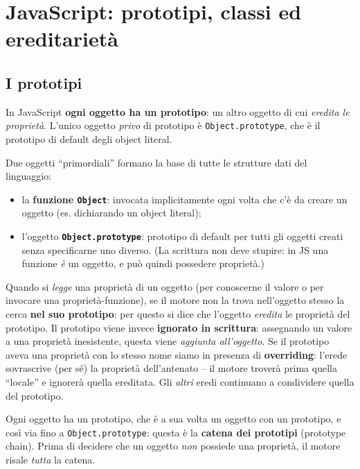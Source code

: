 \chapter{JavaScript: prototipi, classi ed ereditariet\`a}

\section{I prototipi}

\begin{definizione}[Prototipo]
In JavaScript \textbf{ogni oggetto ha un prototipo}: un altro oggetto di cui \emph{eredita le
propriet\`a}. L'unico oggetto \emph{privo} di prototipo \`e \texttt{Object.prototype}, che \`e
il prototipo di default degli object literal.
\end{definizione}

Due oggetti ``primordiali'' formano la base di tutte le strutture dati del linguaggio:
\begin{itemize}
  \item la \textbf{funzione \texttt{Object}}: invocata implicitamente ogni volta che c'\`e da
        creare un oggetto (es. dichiarando un object literal);
  \item l'oggetto \textbf{\texttt{Object.prototype}}: prototipo di default per tutti gli
        oggetti creati senza specificarne uno diverso. (La scrittura non deve stupire: in JS
        una funzione \emph{\`e} un oggetto, e pu\`o quindi possedere propriet\`a.)
\end{itemize}

\begin{importante}
Quando si \emph{legge} una propriet\`a di un oggetto (per conoscerne il valore o per invocare
una propriet\`a-funzione), se il motore non la trova nell'oggetto stesso la cerca \textbf{nel
suo prototipo}: per questo si dice che l'oggetto \emph{eredita} le propriet\`a del prototipo.
Il prototipo viene invece \textbf{ignorato in scrittura}: assegnando un valore a una
propriet\`a inesistente, questa viene \emph{aggiunta all'oggetto}. Se il prototipo aveva una
propriet\`a con lo stesso nome siamo in presenza di \textbf{overriding}: l'erede sovrascrive
(per s\'e) la propriet\`a dell'antenato -- il motore trover\`a prima quella ``locale'' e
ignorer\`a quella ereditata. Gli \emph{altri} eredi continuano a condividere quella del
prototipo.
\end{importante}

\begin{definizione}
Ogni oggetto ha un prototipo, che \`e a sua volta un oggetto con un prototipo, e cos\`i via
fino a \texttt{Object.prototype}: questa \`e la \textbf{catena dei prototipi}
(prototype chain). Prima di decidere che un oggetto \emph{non} possiede una propriet\`a, il
motore risale \emph{tutta} la catena.
\end{definizione}

